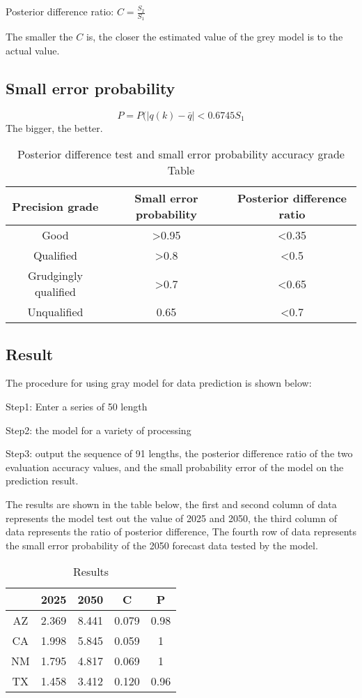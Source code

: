 \documentclass[a4paper]{article}
\begin{document}
Posterior difference ratio: $C = \frac{S_2}{S_1}$

The smaller the $C$ is, the closer the estimated value of the grey model is to the actual value.

\subsection{Small error probability}

\[P = P(|q(k) - \bar{q}| < 0.6745S_1\]
The bigger, the better.

\begin{table}[!htbp]
\centering
\begin{tabular}{ccc}
\toprule
Precision grade & Small error probability & Posterior difference ratio\\
\midrule
Good & >0.95 & <0.35 \\
Qualified & >0.8 & <0.5\\
Grudgingly qualified & >0.7 & <0.65\\
Unqualified & 0.65 & <0.7\\
\bottomrule
\end{tabular}
\caption{Posterior difference test and small error probability accuracy grade Table
}\label{tab:aStrangeTable}
\end{table}

\subsection{Result}

The procedure for using gray model for data prediction is shown below:

Step1: Enter a series of 50 length

Step2:  the model for a variety of processing

Step3:  output the sequence of 91 lengths, the posterior difference ratio of the two evaluation accuracy values, and the small probability error of the model on the prediction result. 

The results are shown in the table below, the first and second column of data represents the model test out the value of 2025 and 2050, the third column of data represents the ratio of posterior difference, The fourth row of data represents the small error probability of the 2050 forecast data tested by the model.

\begin{table}[!htbp]
\centering
\begin{tabular}{ccccc}
\toprule
 &2025 &2050 &C & P\\
\midrule
AZ&2.369 &8.441 & 0.079 & 0.98 \\
CA&1.998 &5.845 & 0.059 & 1\\
NM&1.795 & 4.817 & 0.069 & 1\\
TX&1.458 & 3.412 & 0.120 & 0.96\\
\bottomrule
\end{tabular}
\caption{Results}\label{tab:aStrangeTable}
\end{table}
\end{document}
